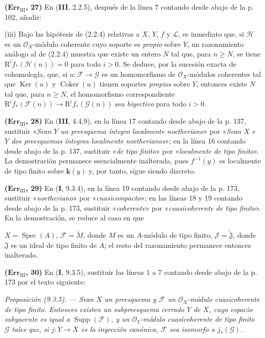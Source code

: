 \documentclass[10pt,oneside]{book}
\newcommand{\oldpage}[2][]{\setcounter{footnote}{0}\marginpar{\scriptsize\textbf{#1}~|~#2}\ignorespaces}
\begin{document}
\noindent\textbf{($\mathbf{Err}_{\mathrm{III}}$, 27)} En (\textbf{III}, 2.2.5),
después de la línea 7 contando desde abajo de la p. 102, añadir:

(iii) Bajo las hipótesis de (2.2.4) relativas a $X$, $Y$, $f$ y $\mathscr L$,
es inmediato que, si $\mathscr H$ es un $\mathscr O_X$-módulo coherente cuyo
soporte es \emph{propio} sobre $Y$, un razonamiento análogo al de (2.2.4)
muestra que existe un entero $N$ tal que, para $n\geq N$, se tiene
$\mathrm R^if_*(\mathscr H(n))=0$ para todo $i>0$. Se deduce, por la sucesión
exacta de cohomología, que, si $u:\mathscr F\to\mathscr G$ es un homomorfismo
de $\mathscr O_X$-módulos coherentes tal que $\operatorname{Ker}(u)$ y
$\operatorname{Coker}(u)$ tienen soportes \emph{propios} sobre $Y$, entonces
existe $N$ tal que, para $n\geq N$, el homomorfismo correspondiente
$\mathrm R^if_*(\mathscr F(n))\to\mathrm R^if_*(\mathscr G(n))$ sea
\emph{biyectivo} para todo $i>0$.

\noindent\textbf{($\mathbf{Err}_{\mathrm{III}}$, 28)} En (\textbf{III}, 4.4.9), en la
línea 17 contando desde abajo de la p. 137, sustituir «\emph{Sean $Y$ un
preesquema íntegro localmente noetheriano}» por «\emph{Sean $X$ e $Y$ dos
preesquemas íntegros localmente noetherianos}»; en la línea 16 contando desde
abajo de la p. 137, sustituir «\emph{de tipo finito}» por «\emph{localmente de
tipo finito}». La demostración permanece esencialmente inalterada, pues
$f^{-1}(y)$ es localmente de tipo finito sobre $\boldsymbol k(y)$ y, por tanto, sigue
siendo discreto.

\noindent\textbf{($\mathbf{Err}_{\mathrm{III}}$, 29)} En (\textbf I, 9.3.4), en la
línea 19 contando desde abajo de la p. 173, sustituir «\emph{noetheriano}» por
«\emph{cuasicompacto}»; en las líneas 18 y 19 contando desde abajo de la p.
173, sustituir «\emph{coherente}» por «\emph{cuasicoherente de tipo finito}».
En la demostración, se reduce al caso en que

\oldpage[III]{223}
$X=\operatorname{Spec}(A)$, $\mathscr F=\widetilde M$, donde $M$ es un
$A$-módulo de tipo finito, $\mathscr J=\widetilde{\mathfrak J}$, donde
$\mathfrak J$ es un ideal de tipo finito de $A$; el resto del razonamiento
permanece entonces inalterado.

\noindent\textbf{($\mathbf{Err}_{\mathrm{III}}$, 30)} En (\textbf I, 9.3.5),
sustituir las líneas 1 a 7 contando desde abajo de la p. 173 por el texto
siguiente:

\emph{Proposición (9.3.5). --- Sean $X$ un preesquema y $\mathscr F$ un
$\mathscr O_X$-módulo cuasicoherente de tipo finito. Entonces existen un
subpreesquema cerrado $Y$ de $X$, cuyo espacio subyacente es igual a
$\operatorname{Supp}(\mathscr F)$, y un $\mathscr O_Y$-módulo cuasicoherente de
tipo finito $\mathscr G$ tales que, si $j:Y\to X$ es la inyección canónica,
$\mathscr F$ sea isomorfo a $j_*(\mathscr G)$.}
\end{document}
